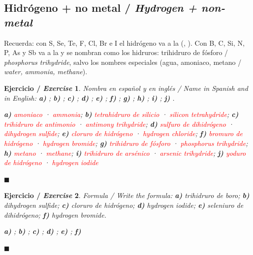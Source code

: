 \documentclass[12pt]{article}
\theoremstyle{mygreennumbox}
\newtheorem{ejercicioT}{Ejercicio / \textit{Exercise}}[section]
\newenvironment{exercise}{\begin{eBoxmygreen}\begin{ejercicioT}}{\hfill{\color{mygreen}\tiny\ensuremath{\blacksquare}}\end{ejercicioT}\end{eBoxmygreen}}
\newcommand{\en}[1]{\textit{#1}}
\begin{document}
\subsection{Hidrógeno + no metal / \en{Hydrogen + non-metal}}

Recuerda: con S, Se, Te, F, Cl, Br e I el hidrógeno va a la  (, ). Con B, C, Si, N, P, As y Sb va a la  y se nombran como los hidruros:  trihidruro de fósforo / \en{phosphorus trihydride}, salvo los nombres especiales (agua, amoniaco, metano / \en{water, ammonia, methane}).

\begin{exercise}
    Nombra en español y en inglés / \en{Name in Spanish and in English}: \textbf{a)} ; \textbf{b)} ; \textbf{c)} ; \textbf{d)} ; \textbf{e)} ; \textbf{f)} ; \textbf{g)} ; \textbf{h)} ; \textbf{i)} ; \textbf{j)} .
    \begin{solu}
        \textbf{a)} \textcolor{red}{amoniaco} · \textcolor{red}{\en{ammonia}}; \textbf{b)} \textcolor{red}{tetrahidruro de silicio} · \textcolor{red}{\en{silicon tetrahydride}}; \textbf{c)} \textcolor{red}{trihidruro de antimonio} · \textcolor{red}{\en{antimony trihydride}}; \textbf{d)} \textcolor{red}{sulfuro de dihidrógeno} · \textcolor{red}{\en{dihydrogen sulfide}}; \textbf{e)} \textcolor{red}{cloruro de hidrógeno} · \textcolor{red}{\en{hydrogen chloride}}; \textbf{f)} \textcolor{red}{bromuro de hidrógeno} · \textcolor{red}{\en{hydrogen bromide}}; \textbf{g)} \textcolor{red}{trihidruro de fósforo} · \textcolor{red}{\en{phosphorus trihydride}}; \textbf{h)} \textcolor{red}{metano} · \textcolor{red}{\en{methane}}; \textbf{i)} \textcolor{red}{trihidruro de arsénico} · \textcolor{red}{\en{arsenic trihydride}}; \textbf{j)} \textcolor{red}{yoduro de hidrógeno} · \textcolor{red}{\en{hydrogen iodide}}
    \end{solu}
\end{exercise}

\begin{exercise}
    Formula / \en{Write the formula}: \textbf{a)} trihidruro de boro; \textbf{b)} \en{dihydrogen sulfide}; \textbf{c)} cloruro de hidrógeno; \textbf{d)} \en{hydrogen iodide}; \textbf{e)} seleniuro de dihidrógeno; \textbf{f)} \en{hydrogen bromide}.
    \begin{solu}
        \textbf{a)} \textcolor{red}{}; \textbf{b)} \textcolor{red}{}; \textbf{c)} \textcolor{red}{}; \textbf{d)} \textcolor{red}{}; \textbf{e)} \textcolor{red}{}; \textbf{f)} \textcolor{red}{}
    \end{solu}
\end{exercise}
\end{document}
